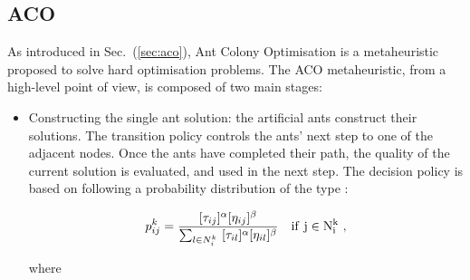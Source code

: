 \documentclass[10pt]{article}
\begin{document}
\subsection{ACO}
As introduced in Sec.~(\ref{sec:aco}), Ant Colony Optimisation is a metaheuristic proposed to solve hard optimisation problems. 
The ACO metaheuristic, from a high-level point of view, is composed of two main stages:
\begin{itemize}
\item Constructing the single ant solution:
the  artificial  ants  construct  their  solutions.  The transition policy controls  the  ants’  next step to one of the adjacent nodes. Once the ants have completed  their  path,  the quality  of  the current solution is evaluated,  and used in the next step. 
The decision policy is based on following a probability distribution of the type \cite{cinque}:

\begin{equation}
p_{ij}^k=  \frac{[\tau_{ij}]^{\alpha}[\eta_{ij}]^{\beta}}{\sum_{l \in N_i^k} ~  [\tau_{il}]^{\alpha}[\eta_{il}]^{\beta}} ~~~\rm{if} ~j \in N_i^k ~,
\label{eq:prob-aco}
\end{equation}

where 
\begin{itemize}


\end{itemize}
\end{itemize}
\end{document}
